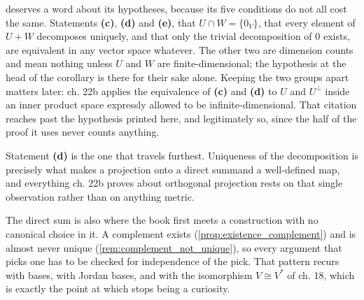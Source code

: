

\begin{ainote}
 deserves a word about its hypotheses, because
its five conditions do not all cost the same. Statements \textbf{(c)},
\textbf{(d)} and \textbf{(e)}, that $U \cap W = \{0_V\}$, that every element of
$U + W$ decomposes uniquely, and that only the trivial decomposition of $0$
exists, are equivalent in any vector space whatever. The other two are dimension
counts and mean nothing unless $U$ and $W$ are finite-di\-men\-sional; the
hypothesis at the head of the corollary is there for their sake alone. Keeping
the two groups apart matters later: ch. 22b applies the equivalence of
\textbf{(c)} and \textbf{(d)} to $U$ and $U^\perp$ inside an inner product space
expressly allowed to be infinite-di\-men\-sional. That citation reaches past the
hypothesis printed here, and legitimately so, since the half of the proof it
uses never counts anything.

Statement \textbf{(d)} is the one that travels furthest. Uniqueness of the
decomposition is precisely what makes a projection onto a direct summand a
well-defined map, and everything ch. 22b proves about orthogonal projection
rests on that single observation rather than on anything metric.

The direct sum is also where the book first meets a construction with no
canonical choice in it. A complement exists (\cref{prop:existence_complement})
and is almost never unique (\cref{rem:complement_not_unique}), so every
argument that picks one has to be checked for independence of the pick. That
pattern recurs with bases, with Jordan bases, and with the isomorphism
$V \cong V^*$ of ch. 18, which is exactly the point at which  stops being a curiosity.
\end{ainote}

